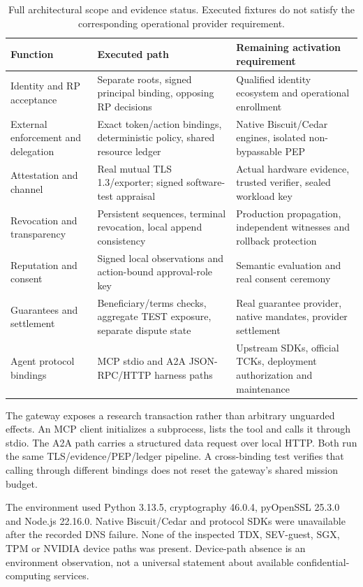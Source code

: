\documentclass[journal,10pt]{IEEEtran}
\begin{document}
\begin{table}[t]
\centering\caption{Full architectural scope and evidence status. Executed fixtures do not satisfy the corresponding operational provider requirement.}\label{tab:scope}
\small\setlength{\tabcolsep}{4pt}\begin{tabular}{p{}p{}p{}}
\toprule Function & Executed path & Remaining activation requirement\\\midrule
Identity and RP acceptance & Separate roots, signed principal binding, opposing RP decisions & Qualified identity ecosystem and operational enrollment\\
External enforcement and delegation & Exact token/action bindings, deterministic policy, shared resource ledger & Native Biscuit/Cedar engines, isolated non-bypassable PEP\\
Attestation and channel & Real mutual TLS 1.3/exporter; signed software-test appraisal & Actual hardware evidence, trusted verifier, sealed workload key\\
Revocation and transparency & Persistent sequences, terminal revocation, local append consistency & Production propagation, independent witnesses and rollback protection\\
Reputation and consent & Signed local observations and action-bound approval-role key & Semantic evaluation and real consent ceremony\\
Guarantees and settlement & Beneficiary/terms checks, aggregate TEST exposure, separate dispute state & Real guarantee provider, native mandates, provider settlement\\
Agent protocol bindings & MCP stdio and A2A JSON-RPC/HTTP harness paths & Upstream SDKs, official TCKs, deployment authorization and maintenance\\\bottomrule
\end{tabular}
\end{table}

The gateway exposes a research transaction rather than arbitrary unguarded effects. An MCP client initializes a subprocess, lists the tool and calls it through stdio. The A2A path carries a structured data request over local HTTP. Both run the same TLS/evidence/PEP/ledger pipeline. A cross-binding test verifies that calling through different bindings does not reset the gateway's shared mission budget.

The environment used Python 3.13.5, cryptography 46.0.4, pyOpenSSL 25.3.0 and Node.js 22.16.0. Native Biscuit/Cedar and protocol SDKs were unavailable after the recorded DNS failure. None of the inspected TDX, SEV-guest, SGX, TPM or NVIDIA device paths was present. Device-path absence is an environment observation, not a universal statement about available confidential-computing services.
\end{document}
